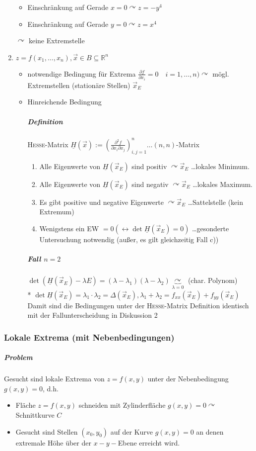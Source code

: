 \documentclass[a4paper]{scrartcl}
\begin{document}
\begin{enumerate}
\begin{itemize}
\item Einschränkung auf Gerade $x=0 \curvearrowright z = -y^4$
\item Einschränkung auf Gerade $y=0 \curvearrowright z = x^4$
\end{itemize}
$\curvearrowright$ keine Extremstelle
\item $z=f(x_1, \dots , x_n), \vec{x} \in B \subseteq \mathbb{R}^n$
\begin{itemize}
\item notwendige Bedingung für Extrema $\frac{\partial f}{\partial x_i} = 0 \quad i=1,\dots,n) \curvearrowright$ mögl. Extremstellen (stationäre Stellen) $\vec{x}_E$
\item Hinreichende Bedingung
\subparagraph{Definition} \textsc{Hesse}-Matrix  $\underline{H}(\vec{x}) := \left ( \frac{\partial^2 f}{\partial x_i \partial x_j} \right )^n_{i,j=1} \dots (n,n)$-Matrix

\begin{enumerate}
\item Alle Eigenwerte von $\underline{H}(\vec{x}_E) $ sind positiv $\curvearrowright \vec{x}_E$ \dots lokales Minimum.
\item Alle Eigenwerte von $\underline{H}(\vec{x}_E) $ sind negativ $\curvearrowright \vec{x}_E$ \dots lokales Maximum.
\item Es gibt positive und negative Eigenwerte $\curvearrowright \vec{x}_E$ \dots Sattelstelle (kein Extremum)
\item Wenigstens ein EW $=0 (\leftrightarrow \det{\underline{H}(\vec{x}_E)} = 0)$ \dots gesonderte Untersuchung notwendig (außer, es gilt gleichzeitig Fall c))
\end{enumerate}

\subparagraph{Fall $n=2$} $\det{(\underline{H} (\vec{x}_E) - \lambda E)}  = (\lambda - \lambda_1) (\lambda - \lambda_2) \underbrace{\curvearrowright}_{\lambda = 0}$ (char. Polynom)\\*
$\det{\underline{H} (\vec{x}_E)} = \lambda_1 \cdot \lambda_2 = \Delta (\vec{x}_E), \lambda_1 + \lambda_2 = f_{xx} (\vec{x}_E) + f_{yy} (\vec{x}_E)$ Damit sind die Bedingungen unter der \textsc{Hesse}-Matrix Definition identisch mit der Fallunterscheidung in Diskussion 2

\end{itemize}
\end{enumerate}

\subsubsection{Lokale Extrema (mit Nebenbedingungen)}
\subparagraph{Problem} Gesucht sind lokale Extrema von $z=f(x,y)$ unter der Nebenbedingung $g(x,y) = 0$, d.h.
\begin{itemize}
\item Fläche $z=f(x,y)$ schneiden mit Zylinderfläche $g(x,y) = 0 \curvearrowright$ Schnittkurve $C$
\item Gesucht sind Stellen $(x_0,y_0)$ auf der Kurve $g(x,y) = 0$ an denen extremale Höhe über der $x-y-$Ebene erreicht wird.
\end{itemize}
\end{document}
